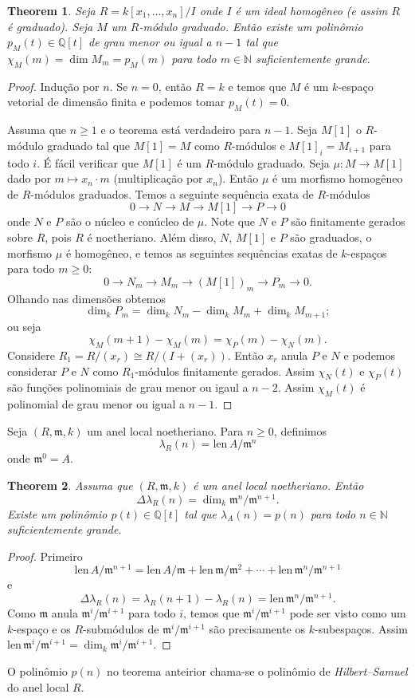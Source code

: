 \documentclass[12pt]{amsart}
\newcommand{\m}{\mathfrak m}
\newcommand{\Q}{\mathbb Q}
\newcommand{\N}{\mathbb N}
\newcommand{\len}{\mbox{len}\,}
\newtheorem{theorem}{Theorem}
\theoremstyle{definition}
\begin{document}
\begin{theorem} Seja $R=k[x_1,\ldots,x_n]/I$ onde $I$ é um ideal homogêneo (e assim $R$ é graduado). 
Seja $M$ um $R$-módulo graduado. Então existe um polinômio $p_M(t)\in\mathbb Q[t]$ de grau menor ou igual a 
$n-1$ tal que $\chi_M(m)=\dim M_m=p_M(m)$ para todo $m\in\mathbb N$ suficientemente grande.  
\end{theorem}


\begin{proof} 
    Indução por $n$. Se $n=0$, então $R=k$ e temos que $M$ é um $k$-espaço vetorial de dimensão finita e podemos tomar $p_M(t)=0$. 

Assuma que $n\geq 1$ e o teorema está verdadeiro para $n-1$. Seja $M[1]$ o $R$-módulo graduado 
tal que $M[1]=M$ como $R$-módulos e $M[1]_i=M_{i+1}$ para todo $i$. É fácil verificar que $M[1]$ é um 
$R$-módulo graduado. Seja $\mu:M\to M[1]$ dado por $m\mapsto x_n\cdot m$ (multiplicação por $x_n$).
Então $\mu$ é um morfismo homogêneo de $R$-módulos graduados. 
Temos a seguinte sequência exata de $R$-módulos
$$
    0\to N \to M\to M[1]\to P\to 0
$$
onde $N$ e $P$ são o núcleo e conúcleo de $\mu$. Note que $N$ e $P$ são finitamente gerados sobre $R$, 
pois $R$ é noetheriano. Além disso, $N$, $M[1]$ e $P$ são graduados, o morfismo $\mu$ é homogêneo, e temos as seguintes sequências 
exatas de $k$-espaços 
para todo $m\geq 0$: 
$$
    0\to N_m \to M_m\to (M[1])_m\to P_m\to 0.
$$
Olhando nas dimensões obtemos  
$$
\dim_k P_m=\dim_k N_m-\dim_k M_m+\dim_k M_{m+1};
$$
ou seja
$$
\chi_M(m+1)-\chi_M(m)=\chi_P(m)-\chi_N(m).
$$
Considere $R_1=R/(x_r)\cong R/(I+(x_r))$. Então $x_r$ anula $P$ e $N$ e podemos considerar $P$ e $N$ como 
$R_1$-módulos finitamente gerados. Assim $\chi_N(t)$ e $\chi_P(t)$ são funções polinomiais de grau menor 
ou igaul a $n-2$. Assim $\chi_M(t)$ é polinomial de grau menor ou igual a $n-1$. 
\end{proof}


Seja $(R,\m,k)$ um anel local noetheriano. Para $n\geq 0$, definimos 
\[
    \lambda_R(n)=\len{A/\m^n}
\]
onde $\m^0=A$. 



\begin{theorem}
Assuma que $(R,\m,k)$ é um anel local noetheriano. Então 
\[
    \Delta\lambda_R(n)=\dim_k\m^n/\m^{n+1}.
\]
Existe um polinômio $p(t)\in\Q[t]$ tal que $\lambda_A(n)=p(n)$ para todo $n\in\N$ suficientemente grande. 
\end{theorem}
\begin{proof}
    Primeiro 
    \[
        \len A/\m^{n+1}=\len A/\m+\len \m/\m^2+\cdots+\len \m^n/\m^{n+1}
    \]
e
\[
    \Delta\lambda_R(n)=\lambda_R(n+1)-\lambda_R(n)=\len \m^n/\m^{n+1}.
\]
Como $\m$ anula $\m^i/\m^{i+1}$ para todo $i$, temos que $\m^i/\m^{i+1}$ pode ser visto como um $k$-espaço e 
os $R$-submódulos de $\m^i/\m^{i+1}$ são precisamente os $k$-subespaços. 
Assim $\len \m^{i}/\m^{i+1}=\dim_k\m^i/\m^{i+1}$. 
\end{proof}
O polinômio $p(n)$ no teorema anteirior chama-se o polinômio de {\em Hilbert--Samuel} do anel local $R$.
\end{document}
